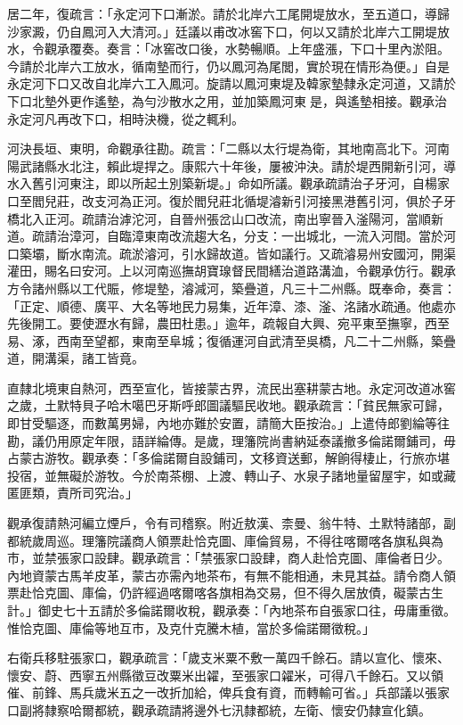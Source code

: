 \begin{pinyinscope}
居二年，復疏言：「永定河下口漸淤。請於北岸六工尾開堤放水，至五道口，導歸沙家澱，仍自鳳河入大清河。」廷議以甫改冰窖下口，何以又請於北岸六工開堤放水，令觀承覆奏。奏言：「冰窖改口後，水勢暢順。上年盛漲，下口十里內淤阻。今請於北岸六工放水，循南墊而行，仍以鳳河為尾閭，實於現在情形為便。」自是永定河下口又改自北岸六工入鳳河。旋請以鳳河東堤及韓家墊隸永定河道，又請於下口北墊外更作遙墊，為勻沙散水之用，並加築鳳河東是，與遙墊相接。觀承治永定河凡再改下口，相時決機，從之輒利。

河決長垣、東明，命觀承往勘。疏言：「二縣以太行堤為衛，其地南高北下。河南陽武諸縣水北注，賴此堤捍之。康熙六十年後，屢被沖決。請於堤西開新引河，導水入舊引河東注，即以所起土別築新堤。」命如所議。觀承疏請治子牙河，自楊家口至閻兒莊，改支河為正河。復於閻兒莊北循堤濬新引河接黑港舊引河，俱於子牙橋北入正河。疏請治滹沱河，自晉州張岔山口改流，南出寧晉入滏陽河，當順新道。疏請治漳河，自臨漳東南改流趨大名，分支：一出城北，一流入河間。當於河口築壩，斷水南流。疏淤濬河，引水歸故道。皆如議行。又疏濬易州安國河，開渠灌田，賜名曰安河。上以河南巡撫胡寶瑔督民間繕治道路溝洫，令觀承仿行。觀承方令諸州縣以工代賑，修堤墊，濬減河，築疊道，凡三十二州縣。既奉命，奏言：「正定、順德、廣平、大名等地民力易集，近年漳、漆、滏、洺諸水疏通。他處亦先後開工。要使瀝水有歸，農田杜患。」逾年，疏報自大興、宛平東至撫寧，西至易、涿，西南至望都，東南至阜城；復循運河自武清至吳橋，凡二十二州縣，築疊道，開溝渠，諸工皆竟。

直隸北境東自熱河，西至宣化，皆接蒙古界，流民出塞耕蒙古地。永定河改道冰窖之歲，土默特貝子哈木噶巴牙斯呼郎圖議驅民收地。觀承疏言：「貧民無家可歸，即甘受驅逐，而數萬男婦，內地亦難於安置，請簡大臣按治。」上遣侍郎劉綸等往勘，議仍用原定年限，語詳綸傳。是歲，理籓院尚書納延泰議撤多倫諾爾鋪司，毋占蒙古游牧。觀承奏：「多倫諾爾自設鋪司，文移資送郵，解餉得棲止，行旅亦堪投宿，並無礙於游牧。今於南茶棚、上渡、轉山子、水泉子諸地量留屋宇，如或藏匿匪類，責所司究治。」

觀承復請熱河編立煙戶，令有司稽察。附近敖漢、柰曼、翁牛特、土默特諸部，副都統歲周巡。理籓院議商人領票赴恰克圖、庫倫貿易，不得往喀爾喀各旗私與為市，並禁張家口設肆。觀承疏言：「禁張家口設肆，商人赴恰克圖、庫倫者日少。內地資蒙古馬羊皮革，蒙古亦需內地茶布，有無不能相通，未見其益。請令商人領票赴恰克圖、庫倫，仍許經過喀爾喀各旗相為交易，但不得久居放債，礙蒙古生計。」御史七十五請於多倫諾爾收稅，觀承奏：「內地茶布自張家口往，毋庸重徵。惟恰克圖、庫倫等地互市，及克什克騰木植，當於多倫諾爾徵稅。」

右衛兵移駐張家口，觀承疏言：「歲支米粟不敷一萬四千餘石。請以宣化、懷來、懷安、蔚、西寧五州縣徵豆改粟米出糴，至張家口糴米，可得八千餘石。又以領催、前鋒、馬兵歲米五之一改折加給，俾兵食有資，而轉輸可省。」兵部議以張家口副將隸察哈爾都統，觀承疏請將邊外七汛隸都統，左衛、懷安仍隸宣化鎮。


\end{pinyinscope}
